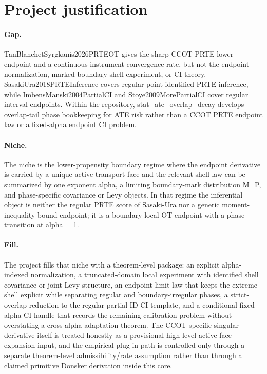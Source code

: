 \documentclass{article}
\begin{document}
\section{Project justification}

\paragraph{Gap.} TanBlanchetSyrgkanis2026PRTEOT gives the sharp CCOT PRTE lower endpoint and a continuous-instrument convergence rate, but not the endpoint normalization, marked boundary-shell experiment, or CI theory. SasakiUra2018PRTEInference covers regular point-identified PRTE inference, while ImbensManski2004PartialCI and Stoye2009MorePartialCI cover regular interval endpoints. Within the repository, stat_ate_overlap_decay develops overlap-tail phase bookkeeping for ATE risk rather than a CCOT PRTE endpoint law or a fixed-alpha endpoint CI problem.

\paragraph{Niche.} The niche is the lower-propensity boundary regime where the endpoint derivative is carried by a unique active transport face and the relevant shell law can be summarized by one exponent alpha, a limiting boundary-mark distribution M_P, and phase-specific covariance or Levy objects. In that regime the inferential object is neither the regular PRTE score of Sasaki-Ura nor a generic moment-inequality bound endpoint; it is a boundary-local OT endpoint with a phase transition at alpha = 1.

\paragraph{Fill.} The project fills that niche with a theorem-level package: an explicit alpha-indexed normalization, a truncated-domain local experiment with identified shell covariance or joint Levy structure, an endpoint limit law that keeps the extreme shell explicit while separating regular and boundary-irregular phases, a strict-overlap reduction to the regular partial-ID CI template, and a conditional fixed-alpha CI handle that records the remaining calibration problem without overstating a cross-alpha adaptation theorem. The CCOT-specific singular derivative itself is treated honestly as a provisional high-level active-face expansion input, and the empirical plug-in path is controlled only through a separate theorem-level admissibility/rate assumption rather than through a claimed primitive Donsker derivation inside this core.
\end{document}
